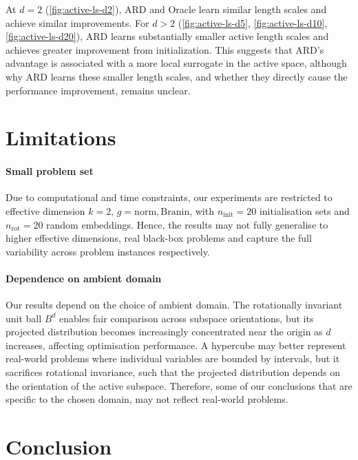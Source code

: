 \documentclass[10pt]{article}
\begin{document}
At \(d=2\) (\cref{fig:active-ls-d2}), ARD and Oracle learn similar length scales and achieve similar improvements. For \(d>2\) (\cref{fig:active-ls-d5}, \cref{fig:active-ls-d10}, \cref{fig:active-ls-d20}), ARD learns substantially smaller active length scales and achieves greater improvement from initialization. This suggests that ARD's advantage is associated with a more local surrogate in the active space, although why ARD learns these smaller length scales, and whether they directly cause the performance improvement, remains unclear.


\section{Limitations}

\paragraph{Small problem set} Due to computational and time constraints, our experiments are restricted to effective dimension \(k=2\), $g = \mathrm{norm}, \mathrm{Branin}$, with \(n_{\mathrm{init}}=20\) initialisation sets and \(n_{\mathrm{rot}}=20\) random embeddings. Hence, the results may not fully generalise to higher effective dimensions, real black-box problems and capture the full variability across problem instances respectively.

\paragraph{Dependence on ambient domain} Our results depend on the choice of ambient domain. The rotationally invariant unit ball \(B^d\) enables fair comparison across subspace orientations, but its projected distribution becomes increasingly concentrated near the origin as \(d\) increases, affecting optimisation performance. A hypercube may better represent real-world problems where individual variables are bounded by intervals, but it sacrifices rotational invariance, such that the projected distribution depends on the orientation of the active subspace. Therefore, some of our conclusions that are specific to the chosen domain, may not reflect real-world problems. 

\section{Conclusion}
\end{document}
